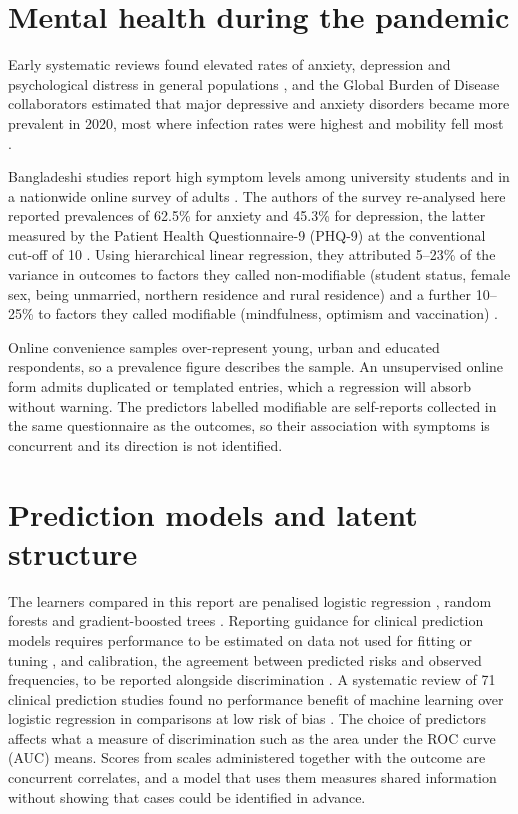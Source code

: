\section{Mental health during the pandemic}
Early systematic reviews found elevated rates of anxiety, depression and psychological distress in general populations \parencite{xiong2020,hossain2020}, and the Global Burden of Disease collaborators estimated that major depressive and anxiety disorders became more prevalent in 2020, most where infection rates were highest and mobility fell most \parencite{santomauro2021}.

Bangladeshi studies report high symptom levels among university students \parencite{islam2020} and in a nationwide online survey of adults \parencite{banna2022}. The authors of the survey re-analysed here reported prevalences of 62.5\% for anxiety and 45.3\% for depression, the latter measured by the Patient Health Questionnaire-9 (PHQ-9) at the conventional cut-off of 10 \parencite{kroenke2001,manea2012}. Using hierarchical linear regression, they attributed 5--23\% of the variance in outcomes to factors they called non-modifiable (student status, female sex, being unmarried, northern residence and rural residence) and a further 10--25\% to factors they called modifiable (mindfulness, optimism and vaccination) \parencite{islam2023}.

Online convenience samples over-represent young, urban and educated respondents, so a prevalence figure describes the sample. An unsupervised online form admits duplicated or templated entries, which a regression will absorb without warning. The predictors labelled modifiable are self-reports collected in the same questionnaire as the outcomes, so their association with symptoms is concurrent and its direction is not identified.

\section{Prediction models and latent structure}
The learners compared in this report are penalised logistic regression \parencite{tibshirani1996,zou2005}, random forests \parencite{breiman2001} and gradient-boosted trees \parencite{friedman2001,chen2016}. Reporting guidance for clinical prediction models requires performance to be estimated on data not used for fitting or tuning \parencite{collins2015}, and calibration, the agreement between predicted risks and observed frequencies, to be reported alongside discrimination \parencite{vancalster2019}. A systematic review of 71 clinical prediction studies found no performance benefit of machine learning over logistic regression in comparisons at low risk of bias \parencite{christodoulou2019}. The choice of predictors affects what a measure of discrimination such as the area under the ROC curve (AUC) means. Scores from scales administered together with the outcome are concurrent correlates, and a model that uses them measures shared information without showing that cases could be identified in advance.

